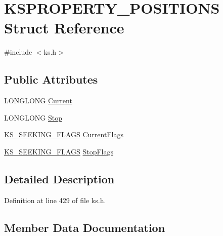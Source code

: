 \hypertarget{struct_k_s_p_r_o_p_e_r_t_y___p_o_s_i_t_i_o_n_s}{}\section{K\+S\+P\+R\+O\+P\+E\+R\+T\+Y\+\_\+\+P\+O\+S\+I\+T\+I\+O\+NS Struct Reference}
\label{struct_k_s_p_r_o_p_e_r_t_y___p_o_s_i_t_i_o_n_s}


{\ttfamily \#include $<$ks.\+h$>$}

\subsection*{Public Attributes}
\begin{DoxyCompactItemize}
\item 
L\+O\+N\+G\+L\+O\+NG \hyperlink{struct_k_s_p_r_o_p_e_r_t_y___p_o_s_i_t_i_o_n_s_a27c7bb9aa752f141cfc7c39f494b36bb}{Current}
\item 
L\+O\+N\+G\+L\+O\+NG \hyperlink{struct_k_s_p_r_o_p_e_r_t_y___p_o_s_i_t_i_o_n_s_a80c5e691f55fd4926af7b2924f2e8b0e}{Stop}
\item 
\hyperlink{ks_8h_a806ae068798d82a245ac622d16a41b6d}{K\+S\+\_\+\+S\+E\+E\+K\+I\+N\+G\+\_\+\+F\+L\+A\+GS} \hyperlink{struct_k_s_p_r_o_p_e_r_t_y___p_o_s_i_t_i_o_n_s_afbad5c10f545d827da9597ed22ad8c2d}{Current\+Flags}
\item 
\hyperlink{ks_8h_a806ae068798d82a245ac622d16a41b6d}{K\+S\+\_\+\+S\+E\+E\+K\+I\+N\+G\+\_\+\+F\+L\+A\+GS} \hyperlink{struct_k_s_p_r_o_p_e_r_t_y___p_o_s_i_t_i_o_n_s_ae2d7844ea91228b76bcf272a0be2607a}{Stop\+Flags}
\end{DoxyCompactItemize}


\subsection{Detailed Description}


Definition at line 429 of file ks.\+h.



\subsection{Member Data Documentation}
